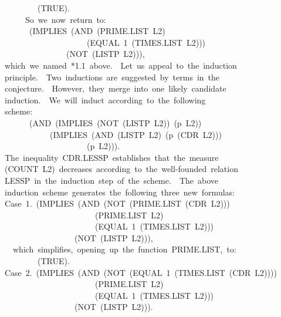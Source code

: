 \documentclass[11pt]{book}
\newenvironment{pubasis}{\begin{flushleft}\ttfamily\small}{\normalsize\rmfamily\end{flushleft}}
\begin{document}
\begin{pubasis}
~~~~~~~~(TRUE).\\

~~~~~So~we~now~return~to:\\

~~~~~~(IMPLIES~(AND~(PRIME.LIST~L2)\\
~~~~~~~~~~~~~~~~~~~~(EQUAL~1~(TIMES.LIST~L2)))\\
~~~~~~~~~~~~~~~(NOT~(LISTP~L2))),\\

which~we~named~*1.1~above.~~Let~us~appeal~to~the~induction\\
principle.~~Two~inductions~are~suggested~by~terms~in~the\\
conjecture.~~However,~they~merge~into~one~likely~candidate\\
induction.~~We~will~induct~according~to~the~following\\
scheme:\\
~~~~~~(AND~(IMPLIES~(NOT~(LISTP~L2))~(p~L2))\\
~~~~~~~~~~~(IMPLIES~(AND~(LISTP~L2)~(p~(CDR~L2)))\\
~~~~~~~~~~~~~~~~~~~~(p~L2))).\\
The~inequality~CDR.LESSP~establishes~that~the~measure\\
(COUNT~L2)~decreases~according~to~the~well-founded~relation\\
LESSP~in~the~induction~step~of~the~scheme.~~The~above\\
induction~scheme~generates~the~following~three~new~formulas:\\

Case~1.~(IMPLIES~(AND~(NOT~(PRIME.LIST~(CDR~L2)))\\
~~~~~~~~~~~~~~~~~~~~~~(PRIME.LIST~L2)\\
~~~~~~~~~~~~~~~~~~~~~~(EQUAL~1~(TIMES.LIST~L2)))\\
~~~~~~~~~~~~~~~~~(NOT~(LISTP~L2))),\\

~~which~simplifies,~opening~up~the~function~PRIME.LIST,~to:\\

~~~~~~~~(TRUE).\\

Case~2.~(IMPLIES~(AND~(NOT~(EQUAL~1~(TIMES.LIST~(CDR~L2))))\\
~~~~~~~~~~~~~~~~~~~~~~(PRIME.LIST~L2)\\
~~~~~~~~~~~~~~~~~~~~~~(EQUAL~1~(TIMES.LIST~L2)))\\
~~~~~~~~~~~~~~~~~(NOT~(LISTP~L2))).\\


\end{pubasis}
\end{document}
